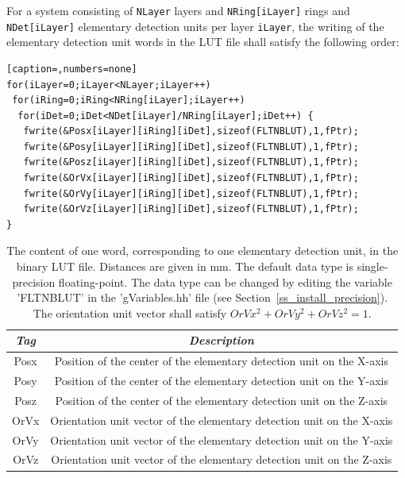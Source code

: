 \documentclass[a4paper, 11pt]{article}
\begin{document}
For a system consisting of {\tt NLayer} layers and {\tt NRing[iLayer]} rings and {\tt NDet[iLayer]} elementary detection units per layer {\tt iLayer}, 
the writing of the elementary detection unit words in the LUT file  shall satisfy the following order: 
\begin{lstlisting}[caption=,numbers=none]
for(iLayer=0;iLayer<NLayer;iLayer++) 
 for(iRing=0;iRing<NRing[iLayer];iLayer++) 
  for(iDet=0;iDet<NDet[iLayer]/NRing[iLayer];iDet++) {
   fwrite(&Posx[iLayer][iRing][iDet],sizeof(FLTNBLUT),1,fPtr);
   fwrite(&Posy[iLayer][iRing][iDet],sizeof(FLTNBLUT),1,fPtr);
   fwrite(&Posz[iLayer][iRing][iDet],sizeof(FLTNBLUT),1,fPtr);
   fwrite(&OrVx[iLayer][iRing][iDet],sizeof(FLTNBLUT),1,fPtr);
   fwrite(&OrVy[iLayer][iRing][iDet],sizeof(FLTNBLUT),1,fPtr);
   fwrite(&OrVz[iLayer][iRing][iDet],sizeof(FLTNBLUT),1,fPtr);
}
\end{lstlisting}

\begin{table} [h!]
  \small
  \caption
  {
    The content of one word, corresponding to one elementary detection unit, in the binary LUT file. 
    Distances are given in mm. 
    The default data type is single-precision floating-point.
    The data type can be changed by editing the variable 'FLTNBLUT' in the 'gVariables.hh' file (see Section~\ref{ss_install_precision}).
    The orientation unit vector shall satisfy $OrVx^2 + OrVy^2 + OrVz^2=1$.
  }
  \label{table_lut}
  \begin{center}
  \begin{tabular}{|c|c|}
  \hline
  \textit{\textbf{Tag}} & \textit{\textbf{Description}} \\
  \hline
  Posx & Position of the center of the elementary detection unit on the X-axis \\ 
  \hline
  Posy & Position of the center of the elementary detection unit on the Y-axis \\ 
  \hline
  Posz & Position of the center of the elementary detection unit on the Z-axis\\ 
  \hline
  OrVx & Orientation unit vector of the elementary detection unit on the X-axis \\ 
  \hline
  OrVy & Orientation unit vector of the elementary detection unit on the Y-axis \\ 
  \hline
  OrVz & Orientation unit vector of the elementary detection unit on the Z-axis \\ 
  \hline
  \end{tabular}
  \end{center}
\end{table}
\end{document}
